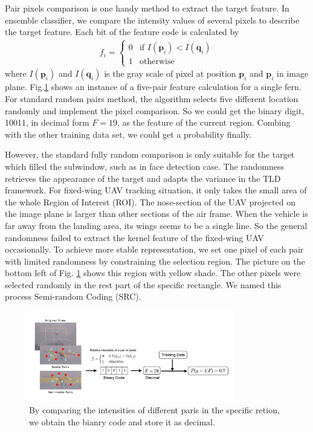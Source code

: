 Pair pixels comparison is one handy method to extract the target feature. In ensemble classifier, we compare the intensity values of several pixels to describe the target feature. Each bit of the feature code is calculated by
\begin{align}
	f_i=\left\{ \begin{array}{ll}
		0 &\mbox{if $I(\mathbf{p}_i) < I(\mathbf{q}_i)$} \\
		1 &\mbox{otherwise} \end{array} \right.
\end{align}
where $I(\mathbf{p}_i)$ and $I(\mathbf{q}_i)$ is the gray scale of pixel at position $\mathbf{p}_i$  and $\mathbf{p}_i$ in image plane. Fig.\ref{fig:01_TLD_Code} shows an instance of a five-pair feature calculation for a single fern. For standard random pairs method, the algorithm selects five different location randomly and implement the pixel comparison. So we could get the binary digit, 10011, in decimal form $F=19$, as the feature of the current region. Combing with the other training data set, we could get a probability finally.

However, the standard fully random comparison is only suitable for the target which filled the subwindow, such as in face detection case. The randomness retrieves the appearance of the target and adapts the variance in the TLD framework. For fixed-wing UAV tracking situation, it only takes the small area of the whole Region of Interest (ROI). The nose-section of the UAV projected on the image plane is larger than other sections of the air frame. When the vehicle is far away from the landing area, its wings seems to be a single line. So the general randomness failed to extract the kernel feature of the fixed-wing UAV occasionally. To achieve more stable representation, we set one pixel of each pair with limited randomness by constraining the selection region. The picture on the bottom left of Fig. \ref{fig:01_TLD_Code} shows this region with yellow shade. The other pixels were selected randomly in the rest part of the specific rectangle. We named this process Semi-random Coding (SRC). 

\begin{figure}[!th]
	\centering
	\includegraphics[width=0.8\textwidth]{Figs/01_TLD_Code.pdf}
	\caption{By comparing the intensities of different paris in the specific retion, we obtain the bianry code and store it as decimal.}
	\label{fig:01_TLD_Code}    
\end{figure}

